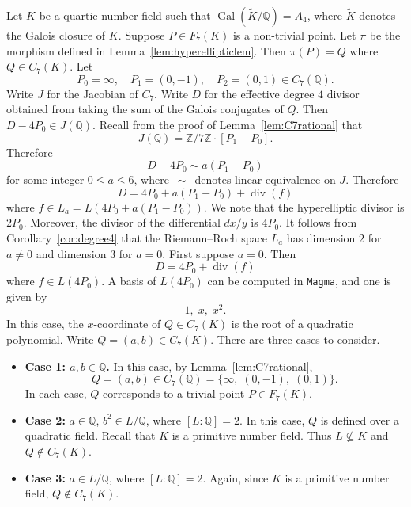 \documentclass{amsart}
\theoremstyle{definition}
\newcommand{\Z}{\mathbb{Z}}
\newcommand{\Q}{\mathbb{Q}}
\DeclareMathOperator{\Gal}{Gal}
\DeclareMathOperator{\divv}{div}
\begin{document}
Let $K$ be a quartic number field such that $\Gal(\tilde{K}/\Q)=A_{4}$, where $\tilde{K}$ denotes the Galois closure of $K$. Suppose $P\in F_{7}(K)$ is a non-trivial point. 
Let $\pi$ be the morphism defined in Lemma~\ref{lem:hyperellipticlem}. 
Then $\pi(P)=Q$ where $Q\in C_7(K)$.
Let
\[
P_0=\infty, \quad P_1=(0,-1), \quad P_2=(0,1) \in C_7(\Q). 
\]
Write $J$ for the Jacobian of $C_7$. 
Write $D$ for the effective degree $4$ divisor obtained from taking the sum of the Galois conjugates of $Q$. Then $D-4P_0\in J(\Q)$. 
Recall from the proof of Lemma~\ref{lem:C7rational} that
\[
    J(\Q)=\Z/7\Z\cdot [P_1-P_0].
\]
Therefore
\[
D-4P_0\sim a(P_1-P_0)
\]
for some integer $0\leq a\leq 6$, where $\,\sim\,$ denotes linear equivalence on $J$. 
Therefore 
\[
D = 4P_0 + a(P_1-P_0) + \divv(f)
\]
where $f\in L_a=L(4P_0 + a(P_1-P_0))$. We note that the hyperelliptic divisor is $2P_0$.
Moreover, the divisor of the differential $dx/y$ is $4P_0$. 
It follows from Corollary~\ref{cor:degree4} that the Riemann--Roch space $L_a$ has dimension $2$ for $a\neq 0$ and dimension $3$ for $a=0$. First suppose $a=0$. 
Then 
\[
D = 4P_0 + \divv(f)
\]
where $f\in L(4P_0)$. A basis of $L(4P_0)$ can be computed in \texttt{Magma}, and one is given by 
\[
1,\; x,\; x^2.
\]
In this case, the $x$-coordinate of $Q\in C_7(K)$ is the root of a quadratic polynomial. Write $Q=(a,b)\in C_7(K)$. There are three cases to consider.
\begin{itemize}
    \item \textbf{Case 1: $a,b\in \Q$.} In this case, by Lemma~\ref{lem:C7rational},
\[
Q=(a,b)\in C_{7}(\Q)=\{ \infty, \; (0,-1),\; (0,1) \}.
\]
In each case, $Q$ corresponds to a trivial point $P\in F_7(K)$.
    \item \textbf{Case 2:} $a\in \Q$, $b^2\in L/\Q$, where $[L:\Q]=2$.
In this case, $Q$ is defined over a quadratic field. 
Recall that $K$ is a primitive number field. 
Thus $L\not\subseteq K$ and $Q\not\in C_7(K)$. 

\item \textbf{Case 3:} $a\in L/\Q$, where $[L:\Q]=2$.
Again, since $K$ is a primitive number field, $Q\not\in C_7(K)$.
\end{itemize}
\end{document}
